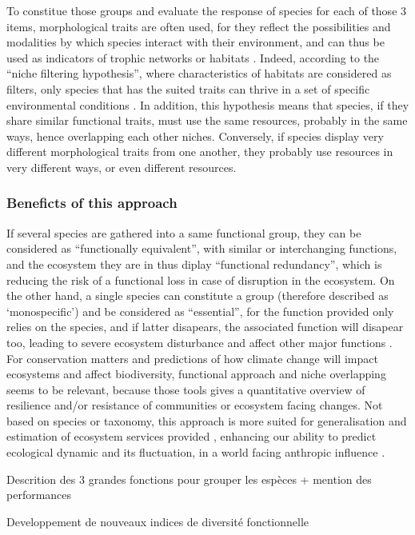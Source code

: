 To constitue those groups and evaluate the response of species for each of those 3 items, morphological traits are often used, for they reflect the possibilities and modalities by which species interact with their environment, and can thus be used as indicators of trophic networks or habitats \citep{brindamour2016}. Indeed, according to the “niche filtering hypothesis”, where characteristics of habitats are considered as filters, only species that has the suited traits can thrive in a set of specific environmental conditions \citep{brindamour2011}. In addition, this hypothesis means that species, if they share similar functional traits, must use the same resources, probably in the same ways, hence overlapping each other niches. Conversely, if species display very different morphological traits from one another, they probably use resources in very different ways, or even different resources. 

\subsubsection{Beneficts of this approach}
If several species are gathered into a same functional group, they can be considered as ``functionally equivalent'', with similar or interchanging functions, and the ecosystem they are in thus diplay ``functional redundancy'', which is reducing the risk of a functional loss in case of disruption in the ecosystem. On the other hand, a single species can constitute a group (therefore described as `monospecific') and be considered as ``essential'', for the function provided only relies on the species, and if latter disapears, the associated function will disapear too, leading to severe ecosystem disturbance and affect other major functions \citep{mejri2009}. 
For conservation matters and predictions of how climate change will impact ecosystems and affect biodiversity, functional approach and niche overlapping seems to be relevant, because those tools gives a quantitative overview of resilience and/or resistance of communities or ecosystem facing changes. Not based on species or taxonomy, this approach is more suited for generalisation and estimation of ecosystem services provided \citep{martini2020,mcgill2006}, enhancing our ability to predict ecological dynamic and its fluctuation, in a world facing anthropic influence \citep{kremer2017}.




Descrition des 3 grandes fonctions pour grouper les espèces + mention des performances 

Developpement de nouveaux indices de diversité fonctionnelle 
